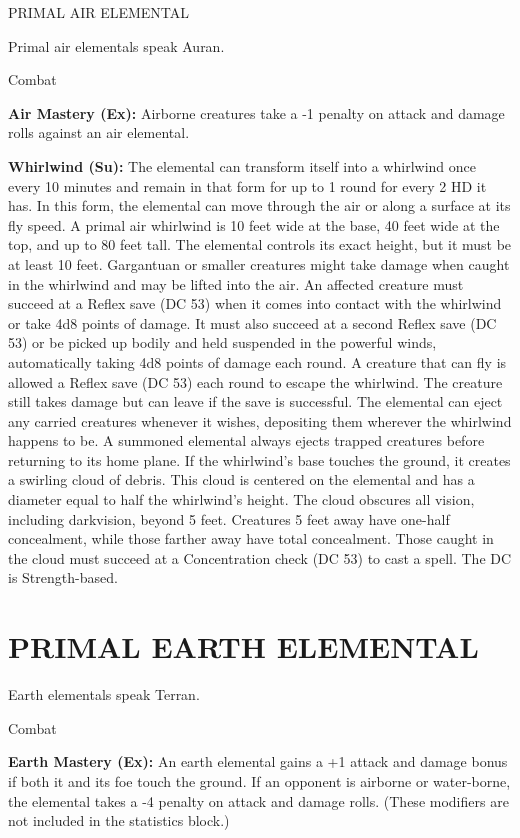 \documentclass{article}
\begin{document}
\parindent=3pt
PRIMAL AIR ELEMENTAL 

\parindent=0pt
Primal air elementals speak Auran. 

Combat\textbf{ }

\textbf{Air Mastery (Ex):} Airborne creatures take a -1 penalty on attack and damage 
rolls against an air elemental. 

\textbf{Whirlwind (Su):} The elemental can transform itself into a whirlwind once 
every 10 minutes and remain in that form for up to 1 round for every 2 HD it has. 
In this form, the elemental can move through the air or along a surface at its 
fly speed.  A primal air whirlwind is 10 feet wide at the base, 40 feet wide at 
the top, and up to 80 feet tall. The elemental controls its exact height, but it 
must be at least 10 feet. Gargantuan or smaller creatures might take damage when 
caught in the whirlwind and may be lifted into the air. An affected creature must 
succeed at a Reflex save (DC 53) when it comes into contact with the whirlwind 
or take 4d8 points of damage. It must also succeed at a second Reflex save (DC 
53) or be picked up bodily and held suspended in the powerful winds, automatically 
taking 4d8 points of damage each round. A creature that can fly is allowed a Reflex 
save (DC 53) each round to escape the whirlwind. The creature still takes damage 
but can leave if the save is successful. The elemental can eject any carried creatures 
whenever it wishes, depositing them wherever the whirlwind happens to be. A summoned 
elemental always ejects trapped creatures before returning to its home plane. If 
the whirlwind's base touches the ground, it creates a swirling cloud of debris. 
This cloud is centered on the elemental and has a diameter equal to half the whirlwind's 
height. The cloud obscures all vision, including darkvision, beyond 5 feet. Creatures 
5 feet away have one-half concealment, while those farther away have total concealment. 
Those caught in the cloud must succeed at a Concentration check (DC 53) to cast 
a spell. The DC is Strength-based.

\section*{PRIMAL EARTH ELEMENTAL }

Earth elementals speak Terran. 

Combat\textbf{ }

\textbf{Earth Mastery (Ex): }An earth elemental gains a +1 attack and damage bonus 
if both it and its foe touch the ground. If an opponent is airborne or water-borne, 
the elemental takes a -4 penalty on attack and damage rolls. (These modifiers are 
not included in the statistics block.) 
\end{document}
